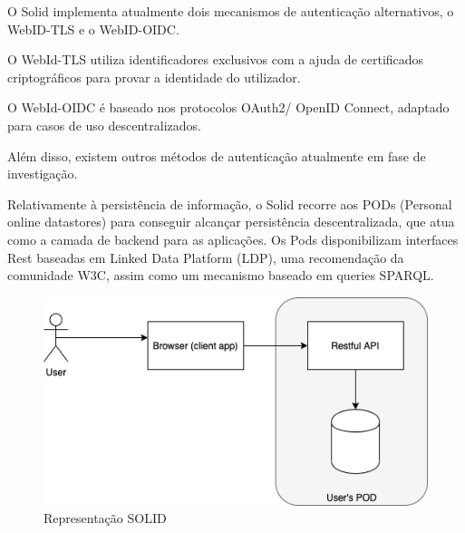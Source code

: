 O Solid implementa atualmente dois mecanismos de autenticação alternativos, o WebID-TLS e o WebID-OIDC. \cite{solid_spec}

O WebId-TLS utiliza identificadores exclusivos com a ajuda de certificados criptográficos para provar a identidade do utilizador. \cite{solid_webid-tls:}

O WebId-OIDC é baseado nos protocolos OAuth2/ OpenID Connect, adaptado para casos de uso descentralizados. \cite{solid_webid_oidc}

Além disso, existem outros métodos de autenticação atualmente em fase de investigação.

Relativamente à persistência de informação, o Solid recorre aos PODs (Personal online datastores) para conseguir alcançar persistência descentralizada, que atua como a camada de backend para as aplicações. Os Pods disponibilizam interfaces Rest baseadas em Linked Data Platform (LDP), uma recomendação da comunidade W3C, assim como um mecanismo baseado em queries SPARQL.\cite{solid_spec}

\begin{figure}[h]
    \begin{center}
    \includegraphics[width=1\textwidth]{figures/estado_arte-Solid.png}
    \caption{Representação SOLID}
    \end{center}
\end{figure}

